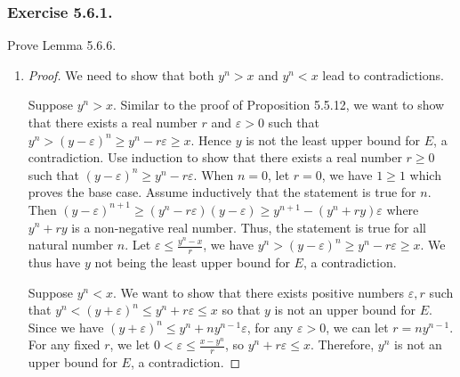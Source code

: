 \documentclass[12pt, letter]{article}
\begin{document}
\subsubsection*{Exercise 5.6.1.}
Prove Lemma 5.6.6.
\begin{enumerate}[label=(\alph*)]
    \item \begin{proof}
        We need to show that both $y^n>x$ and $y^n<x$ lead to contradictions. 

        Suppose $y^n>x$. Similar to the proof of Proposition 5.5.12, we want to show that there exists a real number $r$ and $\varepsilon>0$ such that $y^n>(y-\varepsilon)^n\geq y^n-r\varepsilon\geq x$.
        Hence $y$ is not the least upper bound for $E$, a contradiction. Use induction to show that there exists a real number $r\geq 0$ such that $(y-\varepsilon)^n\geq y^n-r\varepsilon$.
        When $n=0$, let $r=0$, we have $1\geq 1$ which proves the base case. Assume inductively that the statement is true for $n$. Then 
        $(y-\varepsilon)^{n+1}\geq (y^n-r\varepsilon)(y-\varepsilon)\geq y^{n+1}-(y^n+ry)\varepsilon$ where $y^n+ry$ is a non-negative real number. Thus, the statement is true for all natural number $n$.
        Let $\varepsilon\leq\frac{y^n-x}{r}$, we have $y^n>(y-\varepsilon)^n\geq y^n-r\varepsilon\geq x$. We thus have $y$ not being the least upper bound for $E$, a contradiction. 

        Suppose $y^n<x$. We want to show that there exists positive numbers $\varepsilon,r$ such that $y^n<(y+\varepsilon)^n\leq y^n+r\varepsilon\leq x$ so that $y$ is not an upper bound for $E$. 
        Since we have $(y+\varepsilon)^n\leq y^n+ny^{n-1}\varepsilon$, for any $\varepsilon>0$, we can let $r=ny^{n-1}$. For any fixed $r$, we let $0<\varepsilon\leq\frac{x-y^n}{r}$, so $y^n+r\varepsilon\leq x$.
        Therefore, $y^n$ is not an upper bound for $E$, a contradiction.


\end{proof}
\end{enumerate}
\end{document}
